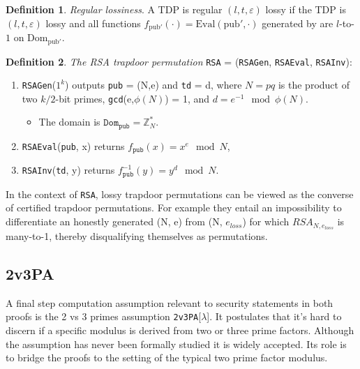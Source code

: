 \documentclass[]{final_report}
\theoremstyle{definition}
\newtheorem{definition}{Definition}[chapter]
\begin{document}
\begin{definition}
\label{def:reg-los}
\textit{Regular lossiness}. A TDP is regular \( (l, t, \varepsilon) \) lossy if the TDP is \( (l, t, \varepsilon) \) lossy and all functions \( f_{\text{pub}'}(\cdot) = \text{Eval}(\text{pub}', \cdot) \) generated by  are \( l \)-to-\( 1 \) on \( \text{Dom}_{\text{pub}'} \).
\end{definition}

\begin{definition} 
\textit{The RSA trapdoor permutation} \texttt{RSA} = (\texttt{RSAGen}, \texttt{RSAEval}, \texttt{RSAInv}): 
\begin{enumerate}
\item \texttt{RSAGen}($1^k$) outputs \texttt{pub} = (N,e) and \texttt{td} = d, where $N = pq$ is the product of two $k/2$-bit primes, \texttt{gcd}(e,$\phi(N)$) = 1, and $d = e^{-1} \mod \phi(N)$. 
\begin{itemize}
\item The domain is $\texttt{Dom}_{\texttt{pub}} = \mathbb{Z}_N^*$. 
\end{itemize}
\item \texttt{RSAEval}(\texttt{pub}, x) returns $f_{\texttt{pub}}(x) = x^e \mod N$, 
\item \texttt{RSAInv}(\texttt{td}, y) returns $f_{\texttt{pub}}^{-1}(y) = y^d \mod N$. 
\end{enumerate}

\end{definition} 

In the context of \texttt{RSA}, lossy trapdoor permutations can be viewed as the converse of certified trapdoor permutations. For example they entail an impossibility to differentiate an honestly generated (N, e) from (N, $e_{loss}$) for which $RSA_{N, e_{loss}}$ is many-to-1, thereby disqualifying themselves as permutations.


\subsection{2v3PA}
A final step computation assumption relevant to security statements in both proofs is the 2 vs 3 primes assumption \texttt{2v3PA}[$\lambda$]. It postulates that it's hard to discern if a specific modulus is derived from two or three prime factors. Although the assumption has never been formally studied it is widely accepted. Its role is to bridge the proofs to the setting of the typical two prime factor modulus.
\end{document}
